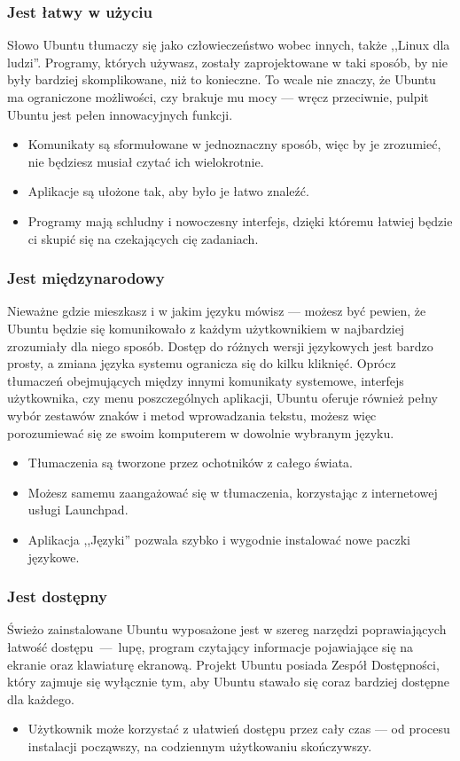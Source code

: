 \subsubsection{Jest łatwy w użyciu}
Słowo Ubuntu tłumaczy się jako \textcolor{ubuntu_orange}{człowieczeństwo wobec innych},  także ,,Linux dla ludzi''. Programy, których używasz, zostały zaprojektowane w taki sposób, by nie były bardziej skomplikowane, niż to konieczne. To wcale nie znaczy, że Ubuntu ma ograniczone możliwości, czy brakuje mu mocy --- wręcz przeciwnie, pulpit Ubuntu jest pełen innowacyjnych funkcji.
\begin{itemize}
\item Komunikaty są sformułowane w jednoznaczny sposób, więc by je zrozumieć, nie będziesz musiał czytać ich wielokrotnie.
\item Aplikacje są ułożone tak, aby było je łatwo znaleźć.
\item Programy mają schludny i nowoczesny interfejs, dzięki któremu łatwiej będzie ci skupić się na czekających cię zadaniach.
\end{itemize}
\subsubsection{Jest międzynarodowy}
Nieważne gdzie mieszkasz i w jakim języku mówisz --- możesz być pewien, że Ubuntu będzie się komunikowało z każdym użytkownikiem w najbardziej zrozumiały dla niego sposób. Dostęp do różnych wersji językowych jest bardzo prosty, a zmiana języka systemu ogranicza się do kilku kliknięć.
Oprócz tłumaczeń obejmujących między innymi komunikaty systemowe, interfejs użytkownika, czy menu poszczególnych aplikacji, Ubuntu oferuje również pełny wybór zestawów znaków i metod wprowadzania tekstu, możesz więc porozumiewać się ze swoim komputerem w dowolnie wybranym języku.
\begin{itemize}
\item Tłumaczenia są tworzone przez ochotników z całego świata.
\item Możesz samemu zaangażować się w tłumaczenia, korzystając z internetowej usługi Launchpad.
\item Aplikacja ,,Języki'' pozwala szybko i wygodnie instalować nowe paczki językowe.
\end{itemize}
\subsubsection{Jest dostępny}
Świeżo zainstalowane Ubuntu wyposażone jest w szereg narzędzi poprawiających łatwość dostępu~---~lupę, program czytający informacje pojawiające się na ekranie oraz klawiaturę ekranową. Projekt Ubuntu posiada Zespół Dostępności, który zajmuje się wyłącznie tym, aby Ubuntu stawało się coraz bardziej dostępne dla każdego.
\begin{itemize}
\item Użytkownik może korzystać z ułatwień dostępu przez cały czas --- od procesu instalacji począwszy, na codziennym użytkowaniu skończywszy.
\end{itemize}
